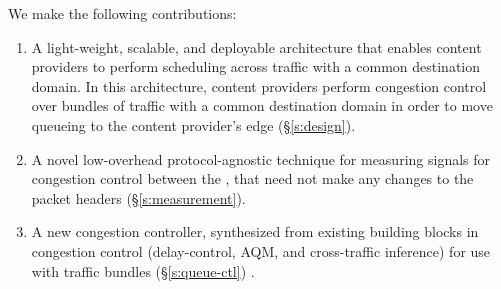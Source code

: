 We make the following contributions:
\begin{enumerate}
    \item A light-weight, scalable, and deployable architecture that enables content providers to perform scheduling across traffic with a common destination domain. In this architecture, content providers perform congestion control over bundles of traffic with a common destination domain in order to move queueing to the content provider's edge (\S\ref{s:design}).
     \item A novel low-overhead protocol-agnostic technique for measuring signals for congestion control between the \pair, that need not make any changes to the packet headers (\S\ref{s:measurement}).
     \item A new congestion controller, synthesized from existing building blocks in congestion control (delay-control, AQM, and cross-traffic inference) for use with traffic bundles (\S\ref{s:queue-ctl}) .
\end{enumerate}
